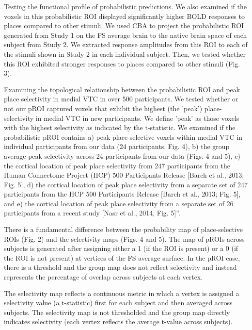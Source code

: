Testing the functional profile of probabilistic predictions.
%
We also examined if the voxels in this probabilistic ROI displayed significantly
higher BOLD responses to places compared to other stimuli.
%
We used CBA to project the probabilistic ROI generated from Study 1 on the FS
average brain to the native brain space of each subject from Study 2.
%
We extracted response amplitudes from this ROI to each of the stimuli shown in
Study 2 in each individual subject.
%
Then, we tested whether this ROI exhibited stronger responses to places compared
to other stimuli (Fig. 3).

Examining the topological relationship between the probabilistic ROI and peak
place selectivity in medial VTC in over 500 participants.
%
We tested whether or not our pROI captured voxels that exhibit the highest (the
'peak') place-selectivity in medial VTC in new participants.
%
We define 'peak' as those voxels with the highest selectivity as indicated
by the t-statistic.
%
We examined if the probabilistic pROI contains
%
a) peak place-selective voxels within medial VTC in individual participants
from our data (24 participants, Fig. 4),
%
b) the group average peak selectivity across 24 participants from our data
(Figs. 4 and 5),
%
c) the cortical location of peak place selectivity from 247 participants from
the Human Connectome Project (HCP) 500 Participants Release [Barch et al., 2013;
Fig. 5],
%
d) the cortical location of peak place selectivity from a separate set of 247
participants from the HCP 500 Participants Release [Barch et al., 2013; Fig. 5],
and
%
e) the cortical location of peak place selectivity from a separate set of 26
participants from a recent study [Nasr et al., 2014, Fig. 5]''.

There is a fundamental difference between the probability map of place-selective
ROIs (Fig. 2) and the selectivity maps (Figs.  4 and 5).
%
The map of pROIs across subjects is generated after assigning either a 1 (if the
ROI is present) or a 0 (if the ROI is not present) at vertices of the FS average
surface.
%
In the pROI case, there is a threshold and the group map does not reflect
selectivity and instead represents the percentage of overlap across subjects at
each vertex.

%
The selectivity map reflects a continuous metric in which a vertex is assigned a
selectivity value (a t-statistic) first for each subject and then averaged
across subjects.
%
The selectivity map is not thresholded and the group map directly indicates
selectivity (each vertex reflects the average t-value across subjects).
%

